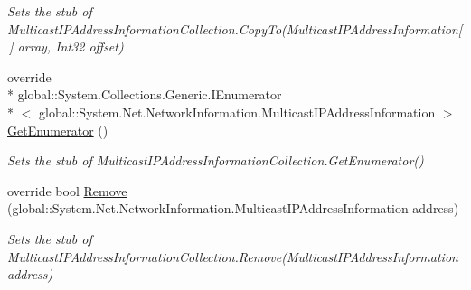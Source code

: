 \begin{DoxyCompactItemize}
\begin{DoxyCompactList}\small\item\em Sets the stub of Multicast\-I\-P\-Address\-Information\-Collection.\-Copy\-To(\-Multicast\-I\-P\-Address\-Information\mbox{[}$\,$\mbox{]} array, Int32 offset)\end{DoxyCompactList}\item 
override \\*
global\-::\-System.\-Collections.\-Generic.\-I\-Enumerator\\*
$<$ global\-::\-System.\-Net.\-Network\-Information.\-Multicast\-I\-P\-Address\-Information $>$ \hyperlink{class_system_1_1_net_1_1_network_information_1_1_fakes_1_1_stub_multicast_i_p_address_information_collection_acd6257a9bc0ed7dcfed10b93366ef761}{Get\-Enumerator} ()
\begin{DoxyCompactList}\small\item\em Sets the stub of Multicast\-I\-P\-Address\-Information\-Collection.\-Get\-Enumerator()\end{DoxyCompactList}\item 
override bool \hyperlink{class_system_1_1_net_1_1_network_information_1_1_fakes_1_1_stub_multicast_i_p_address_information_collection_a48e5245512de03818e35fcf6150d4d77}{Remove} (global\-::\-System.\-Net.\-Network\-Information.\-Multicast\-I\-P\-Address\-Information address)
\begin{DoxyCompactList}\small\item\em Sets the stub of Multicast\-I\-P\-Address\-Information\-Collection.\-Remove(\-Multicast\-I\-P\-Address\-Information address)\end{DoxyCompactList}\end{DoxyCompactItemize}
